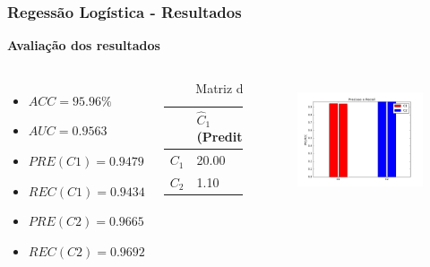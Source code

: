 \documentclass{beamer}
\begin{document}
\begin{frame}
\frametitle{Regessão Logística - Resultados}

\textbf{Avaliação dos resultados}
\begin{columns}[c] 
\begin{itemize}
\item $ACC = 95.96 \%$
\item $AUC = 0.9563 $
\item $PRE(C1) = 0.9479$
\item $REC(C1) = 0.9434$
\item $PRE(C2) = 0.9665$
\item $REC(C2) = 0.9692$
\end{itemize}

\begin{table}
\begin{tabular}{l l l}
\toprule
 & \textbf{$\hat{C}_1$ (Predita)} & \textbf{$\hat{C}_2$(Predita)}\\
\midrule
$C_1$ & 20.00&1.20\\ 
$C_2$ & 1.10&34.60\\ 
\bottomrule
\end{tabular}
\caption{Matriz de confusão}
\end{table}


\begin{figure}[H]
\centering
  \includegraphics[width=\linewidth]{../img/log_reg_rec.png}
  \label{fig:percep}
\end{figure}%

\end{columns}

\end{frame}
\end{document}
